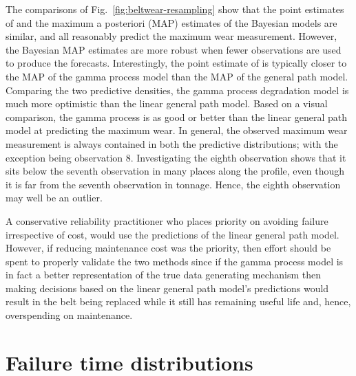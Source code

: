The comparisons of Fig.~\ref{fig:beltwear-resampling} show that the point estimates of \citet{webb_2020} and the maximum a posteriori (MAP) estimates of the Bayesian models are similar, and all reasonably predict the maximum wear measurement. However, the Bayesian MAP estimates are more robust when fewer observations are used to produce the forecasts. Interestingly, the point estimate of \citet{webb_2020} is typically closer to the MAP of the gamma process model than the MAP of the general path model. Comparing the two predictive densities, the gamma process degradation model is much more optimistic than the linear general path model. Based on a visual comparison, the gamma process is as good or better than the linear general path model at predicting the maximum wear. In general, the observed maximum wear measurement is always contained in both the predictive distributions; with the exception being observation $8$. Investigating the eighth observation shows that it sits below the seventh observation in many places along the profile, even though it is far from the seventh observation in tonnage. Hence, the eighth observation may well be an outlier.

A conservative reliability practitioner who places priority on avoiding failure irrespective of cost, would use the predictions of the linear general path model. However, if reducing maintenance cost was the priority, then effort should be spent to properly validate the two methods since if the gamma process model is in fact a better representation of the true data generating mechanism then making decisions based on the linear general path model's predictions would result in the belt being replaced while it still has remaining useful life and, hence, overspending on maintenance.

\section{Failure time distributions} \label{sec:belt-wear-ft}

